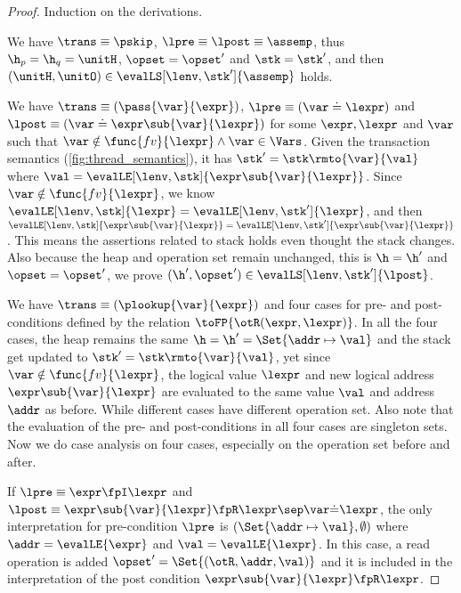 \begin{proof}
Induction on the derivations.


We have \(\trans \equiv \pskip\), \( \lpre \equiv \lpost \equiv \assemp \), thus \( \h_{p} = \h_{q} = \unitH \), \( \opset = \opset' \) and \( \stk = \stk' \), and then \( (\unitH,\unitO ) \in \evalLS[\lenv, \stk']{\assemp} \) holds.


We have \(\trans \equiv ( \pass{\var}{\expr} ) \), \( \lpre \equiv ( \var \doteq \lexpr ) \) and \( \lpost \equiv ( \var \doteq \expr\sub{\var}{\lexpr} ) \) for some \( \expr, \lexpr \) and \( \var \) such that \( \var \notin \func{fv}{\lexpr} \land \var \in \Vars\).
Given the transaction semantics (\cref{fig:thread_semantics}), it has \( \stk' = \stk\rmto{\var}{\val} \) where \( \val = \evalLE[\lenv, \stk]{\expr\sub{\var}{\lexpr}} \).
Since \( \var \notin \func{fv}{\lexpr} \), we know \( \evalLE[\lenv, \stk]{\lexpr} = \evalLE[\lenv, \stk']{\lexpr} \), and then \( \evalLE[\lenv, \stk]{\expr\sub{\var}{\lexpr}} = \evalLE[\lenv, \stk']{\expr\sub{\var}{\lexpr}} \).
This means the assertions related to stack holds even thought the stack changes.
Also because the heap and operation set remain unchanged, this is \( \h = \h' \) and \( \opset = \opset' \), we prove \( (\h', \opset' ) \in \evalLS[\lenv, \stk']{\lpost} \).


We have  \(\trans \equiv ( \plookup{\var}{\expr} ) \) and four cases for pre- and post-conditions defined by the relation \( \toFP{\otR(\expr, \lexpr)}\).
In all the four cases, the heap remains the same \( \h = \h' = \Set{\addr \mapsto \val}\) and the stack get updated to \( \stk' = \stk\rmto{\var}{\val} \), yet since \( \var \notin \func{fv}{\lexpr}\), the logical value \( \lexpr \) and new logical address \( \expr\sub{\var}{\lexpr}\) are evaluated to the same value \( \val \) and address \( \addr \) as before.
While different cases have different operation set.
Also note that the evaluation of the pre- and post-conditions in all four cases are singleton sets.
Now we do case analysis on four cases, especially on the operation set before and after.

If \( \lpre \equiv \expr \fpI \lexpr \) and \( \lpost \equiv \expr\sub{\var}{\lexpr} \fpR \lexpr \sep \var \dot= \lexpr \), the only interpretation for pre-condition \( \lpre \) is \( (\Set{\addr \mapsto \val}, \emptyset) \) where \( \addr = \evalLE{\expr} \) and \( \val = \evalLE{\lexpr}\).
In this case, a read operation is added \( \opset' = \Set{(\otR, \addr, \val)} \) and it is included in the interpretation of the post condition  \( \expr\sub{\var}{\lexpr} \fpR \lexpr  \).


\end{proof}
